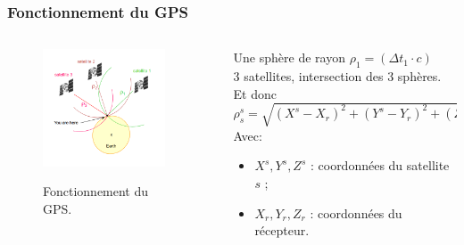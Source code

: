 \documentclass[xcolor=dvipsnames,envcountsect]{beamer}
\begin{document}
\begin{frame}
	\frametitle{Fonctionnement du GPS}
	\justifying
	\begin{columns}

		\begin{column}{0.5\textwidth}
			\begin{figure}
				\centering
				\includegraphics[width=0.9\textwidth]{./Figures/ENS_gnss.png} \\
				\caption {Fonctionnement du GPS. \cite{ens}}
			\end{figure}
		\end{column}

		\begin{column}{0.5\textwidth}
			Une sphère de rayon $\rho_1 = (\Delta t_1 \cdot c) $ \\
			3 satellites, intersection des 3 sphères.
			\newline
			Et donc {\footnotesize$\rho_s^s = \sqrt{(X^s-X_r)^2 + (Y^s-Y_r)^2 + (Z^s-Z_r)^2}$} \\
			Avec:
			\begin{itemize}
				\item $X^s, Y^s, Z^s$ : coordonnées du satellite $s$ ;
				\item $X_r, Y_r, Z_r$ : coordonnées du récepteur.
			\end{itemize}
		\end{column}

	\end{columns}

\end{frame}
\end{document}
